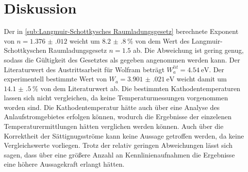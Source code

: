 \section{Diskussion}
\label{sec:Diskussion}

Der in \ref{sub:Langmuir-Schottkysches Raumladungsgesetz} berechnete Exponent von $n=\num{1.376(012)}$ weicht um $\SI{8.2(8)}{\percent}$ von dem Wert des Langmuir-Schottkyschen Raumladungsgesetz $n=\num{1.5}$ ab. Die Abweichung ist gering genug, sodass die Gültigkeit des Gesetztes als gegeben angenommen werden kann.
Der Literaturwert des Austrittsarbeit für Wolfram beträgt $W_a^{lit}=\SI{4.54}{\eV}$. Der experimentell bestimmte Wert von $W_a=\SI{3.901(021)}{\eV}$ weicht damit um $\SI{14.1(5)}{\percent}$ von dem Literaturwert ab. 
Die bestimmten Kathodentemperaturen lassen sich nicht vergleichen, da keine Temperaturmessungen vorgenommen worden sind. Die Kathodentemperatur hätte auch über eine Analyse des Anlaufstromgebietes erfolgen können, wodurch die Ergebnisse der einzelenen Temperaturermittlungen hätten verglichen werden können. Auch über die Korrektheit der Sättignugsströme kann keine Aussage getroffen werden, da keine Vergleichswerte vorliegen. Trotz der relativ geringen Abweichungen lässt sich sagen, dass über eine größere
Anzahl an Kennlinienaufnahmen die Ergebnisse eine höhere Aussagekraft erlangt hätten. 
